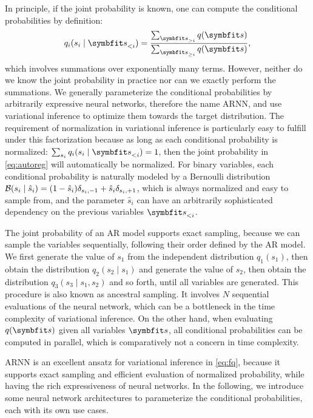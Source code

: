 In principle, if the joint probability is known, one can compute the conditional probabilities by definition:
\begin{equation}
q_i(s_i \mid \vs_{< i}) = \frac{\sum_{\vs_{> i}} q(\vs)}{\sum_{\vs_{\ge i}} q(\vs)},
\end{equation}
which involves summations over exponentially many terms. However, neither do we know the joint probability in practice nor can we exactly perform the summations. We generally parameterize the conditional probabilities by arbitrarily expressive neural networks, therefore the name ARNN, and use variational inference to optimize them towards the target distribution. The requirement of normalization in variational inference is particularly easy to fulfill under this factorization because as long as each conditional probability is normalized: $\sum_{s_i} q_i(s_i \mid \vs_{< i}) = 1$, then the joint probability in \cref{eq:autoreg} will automatically be normalized. For binary variables, each conditional probability is naturally modeled by a Bernoulli distribution $\mathcal{B}(s_i \mid \hat{s}_i) = (1 - \hat{s}_i) \delta_{s_i, -1} + \hat{s}_i \delta_{s_i, +1}$, which is always normalized and easy to sample from, and the parameter $\hat{s}_i$ can have an arbitrarily sophisticated dependency on the previous variables $\vs_{< i}$.

The joint probability of an AR model supports exact sampling, because we can sample the variables sequentially, following their order defined by the AR model. We first generate the value of $s_1$ from the independent distribution $q_1(s_1)$, then obtain the distribution $q_2(s_2 \mid s_1)$ and generate the value of $s_2$, then obtain the distribution $q_3(s_3 \mid s_1, s_2)$ and so forth, until all variables are generated. This procedure is also known as ancestral sampling. It involves $N$ sequential evaluations of the neural network, which can be a bottleneck in the time complexity of variational inference. On the other hand, when evaluating $q(\vs)$ given all variables $\vs$, all conditional probabilities can be computed in parallel, which is comparatively not a concern in time complexity.

ARNN is an excellent ansatz for variational inference in \cref{eq:fq}, because it supports exact sampling and efficient evaluation of normalized probability, while having the rich expressiveness of neural networks. In the following, we introduce some neural network architectures to parameterize the conditional probabilities, each with its own use cases.

